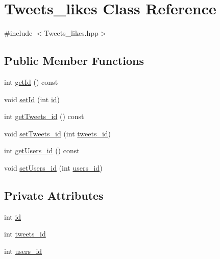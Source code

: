 \hypertarget{class_tweets__likes}{}\section{Tweets\+\_\+likes Class Reference}
\label{class_tweets__likes}


{\ttfamily \#include $<$Tweets\+\_\+likes.\+hpp$>$}

\subsection*{Public Member Functions}
\begin{DoxyCompactItemize}
\item 
int \hyperlink{class_tweets__likes_a4deac2808edbc15c8f800ac62573fc4c}{get\+Id} () const
\item 
void \hyperlink{class_tweets__likes_ac7c7dc28a6a3c8c20ae8a92d4004679e}{set\+Id} (int \hyperlink{class_tweets__likes_a9505ceba5a0326da289b7cf1142d8ad6}{id})
\item 
int \hyperlink{class_tweets__likes_a6390564a748cdeed38219a14a548defe}{get\+Tweets\+\_\+id} () const
\item 
void \hyperlink{class_tweets__likes_a1fc426728ccc5de054bb04b46a2dcea3}{set\+Tweets\+\_\+id} (int \hyperlink{class_tweets__likes_a092209fd2e34feebf6df7614c1803d36}{tweets\+\_\+id})
\item 
int \hyperlink{class_tweets__likes_ad19e9e7eb18778950282f467a9891ace}{get\+Users\+\_\+id} () const
\item 
void \hyperlink{class_tweets__likes_acd0888290310f6f5a29eedd07a3a5a4c}{set\+Users\+\_\+id} (int \hyperlink{class_tweets__likes_accb88ebacd1e5eeefadbdddfb7c10e8e}{users\+\_\+id})
\end{DoxyCompactItemize}
\subsection*{Private Attributes}
\begin{DoxyCompactItemize}
\item 
int \hyperlink{class_tweets__likes_a9505ceba5a0326da289b7cf1142d8ad6}{id}
\item 
int \hyperlink{class_tweets__likes_a092209fd2e34feebf6df7614c1803d36}{tweets\+\_\+id}
\item 
int \hyperlink{class_tweets__likes_accb88ebacd1e5eeefadbdddfb7c10e8e}{users\+\_\+id}
\end{DoxyCompactItemize}


